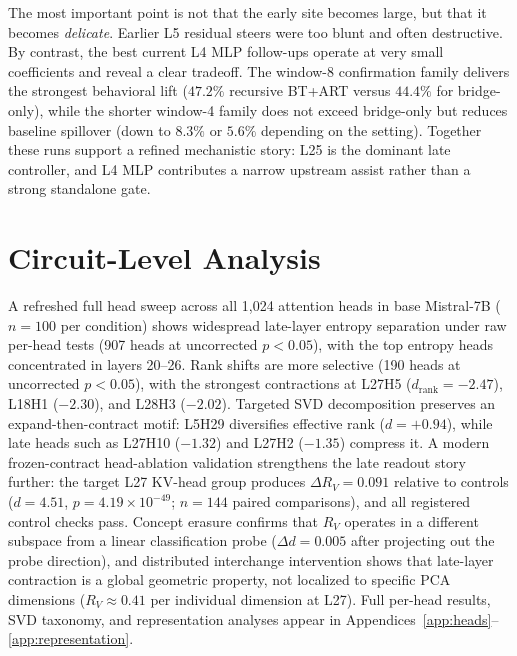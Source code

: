 \documentclass{article}
\newcommand{\RV}{R_V}
\newcommand{\dcohen}{d}
\begin{document}
The most important point is not that the early site becomes large, but that it becomes
\emph{delicate}. Earlier L5 residual steers were too blunt and often destructive.
By contrast, the best current L4 MLP follow-ups operate at very small coefficients and reveal a
clear tradeoff. The window-8 confirmation family delivers the strongest behavioral lift
($47.2\%$ recursive BT+ART versus $44.4\%$ for bridge-only), while the shorter window-4 family
does not exceed bridge-only but reduces baseline spillover (down to $8.3\%$ or $5.6\%$ depending
on the setting).
Together these runs support a refined mechanistic story:
L25 is the dominant late controller, and L4 MLP contributes a narrow upstream assist rather than a
strong standalone gate.


\section{Circuit-Level Analysis}
\label{sec:circuits}

A refreshed full head sweep across all 1{,}024 attention heads in base Mistral-7B
($n = 100$ per condition) shows widespread late-layer entropy separation under raw per-head tests
(907 heads at uncorrected $p < 0.05$), with the top entropy heads concentrated in layers 20--26.
Rank shifts are more selective (190 heads at uncorrected $p < 0.05$), with the strongest
contractions at L27H5 ($\dcohen_\mathrm{rank} = -2.47$), L18H1 ($-2.30$), and L28H3 ($-2.02$).
Targeted SVD decomposition preserves an expand-then-contract motif:
L5H29 diversifies effective rank ($\dcohen = +0.94$), while late heads such as
L27H10 ($-1.32$) and L27H2 ($-1.35$) compress it.
A modern frozen-contract head-ablation validation strengthens the late readout story further:
the target L27 KV-head group produces $\Delta \RV = 0.091$ relative to controls
($\dcohen = 4.51$, $p = 4.19 \times 10^{-49}$; $n = 144$ paired comparisons), and all registered
control checks pass.
Concept erasure confirms that $\RV$ operates in a different subspace from a linear
classification probe ($\Delta d = 0.005$ after projecting out the probe direction), and
distributed interchange intervention shows that late-layer contraction is a global geometric
property, not localized to specific PCA dimensions ($\RV \approx 0.41$ per individual dimension
at L27).
Full per-head results, SVD taxonomy, and representation analyses appear in
Appendices~\ref{app:heads}--\ref{app:representation}.
\end{document}
